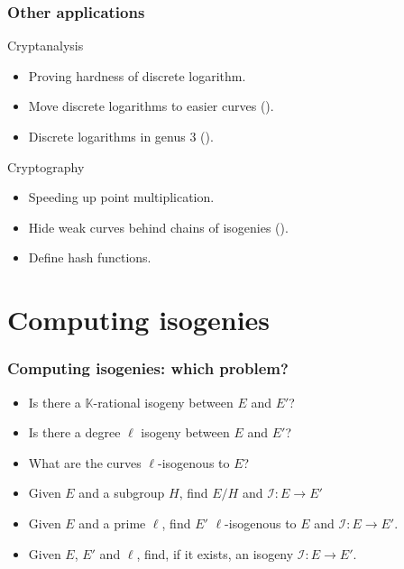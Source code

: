 \documentclass[10pt]{beamer}
\newcommand{\K}{\mathbb{K}}  %
\newcommand{\0}{\mathcal{O}}  %
\newcommand{\isog}[1]{\mathcal{#1}}  %
\newcommand{\I}{\isog{I}}  %
\begin{document}
\begin{frame}
  \frametitle{Other applications}
  
  \begin{block}{Cryptanalysis}
    \begin{itemize}
    \item Proving hardness of discrete logarithm.
    \item Move discrete logarithms to easier curves (\cite{GHS}).
    \item Discrete logarithms in genus $3$ (\cite{Ben}).
    \end{itemize}
  \end{block}
  
  \begin{block}{Cryptography}
    \begin{itemize}
    \item Speeding up point multiplication.
    \item Hide weak curves behind chains of isogenies (\cite{Tes06}).
    \item Define hash functions.
    \end{itemize}
  \end{block}
\end{frame}


\section{Computing isogenies}

\begin{frame}
  \frametitle{Computing isogenies: which problem?}
  
  \begin{itemize}
  \setlength{\itemsep}{1em}
  \item Is there a $\K$-rational isogeny between $E$ and $E'$?
    \hfill\only<2->{\textcolor{blue}{$\Leftrightarrow \#E(\K) = \#E'(\K)$}}
  \item Is there a degree $\ell$ isogeny between $E$ and $E'$?
    \hfill{}
  \item What are the curves $\ell$-isogenous to $E$?
    \hfill{}
  \item Given $E$ and a subgroup $H$, find $E/H$ and $\I:E\rightarrow
    E'$ \hfill{}
  \item Given $E$ and a prime $\ell$, find $E'$ $\ell$-isogenous to
    $E$ and $\I:E\rightarrow E'$.
  \item \alert<6>{Given $E$, $E'$ and $\ell$, find, if it exists, an isogeny
    $\I:E\rightarrow E'$.}
  \end{itemize}

\end{frame}
\end{document}
